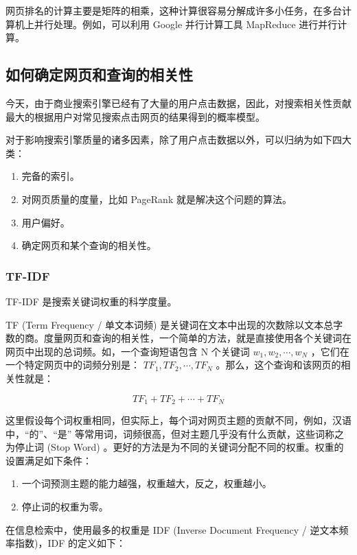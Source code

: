 \documentclass[11pt]{article}
\begin{document}
网页排名的计算主要是矩阵的相乘，这种计算很容易分解成许多小任务，在多台计算机上并行处理。例如，可以利用 Google 并行计算工具 MapReduce 进行并行计算。

\subsection{如何确定网页和查询的相关性}
\label{sec:org951e9d7}
今天，由于商业搜索引擎已经有了大量的用户点击数据，因此，对搜索相关性贡献最大的根据用户对常见搜索点击网页的结果得到的概率模型。

对于影响搜索引擎质量的诸多因素，除了用户点击数据以外，可以归纳为如下四大类：

\begin{enumerate}
\item 完备的索引。
\item 对网页质量的度量，比如 PageRank 就是解决这个问题的算法。
\item 用户偏好。
\item 确定网页和某个查询的相关性。
\end{enumerate}

\subsubsection{TF-IDF}
\label{sec:org6b1156c}
TF-IDF 是搜索关键词权重的科学度量。

TF (Term Frequency / 单文本词频) 是关键词在文本中出现的次数除以文本总字数的商。度量网页和查询的相关性，一个简单的方法，就是直接使用各个关键词在网页中出现的总词频。如，一个查询短语包含 N 个关键词 \(w_{1}, w_{2}, \cdots, w_{N}\) ，它们在一个特定网页中的词频分别是： \(TF_{1}, TF_{2}, \cdots, TF_{N}\) 。那么，这个查询和该网页的相关性就是：

\begin{equation}
TF_{1} + TF_{2} + \cdots + TF_{N}
\end{equation}

这里假设每个词权重相同，但实际上，每个词对网页主题的贡献不同，例如，汉语中，“的”、“是” 等常用词，词频很高，但对主题几乎没有什么贡献，这些词称之为停止词 (Stop Word) 。更好的方法是为不同的关键词分配不同的权重。权重的设置满足如下条件：
\begin{enumerate}
\item 一个词预测主题的能力越强，权重越大，反之，权重越小。
\item 停止词的权重为零。
\end{enumerate}

在信息检索中，使用最多的权重是 IDF (Inverse Document Frequency / 逆文本频率指数)，IDF 的定义如下：
\end{document}

